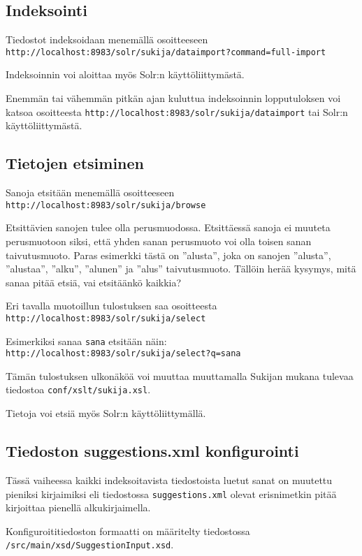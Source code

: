 \documentclass[12pt]{article}
\begin{document}
\subsection*{Indeksointi}

Tiedostot indeksoidaan menemällä osoitteeseen
\verb|http://localhost:8983/solr/sukija/dataimport?command=full-import|

Indeksoinnin voi aloittaa myös Solr:n käyttöliittymästä.

Enemmän tai vähemmän pitkän ajan kuluttua indeksoinnin lopputuloksen
voi katsoa osoitteesta
\verb|http://localhost:8983/solr/sukija/dataimport|
tai Solr:n käyttöliittymästä.


\subsection*{Tietojen etsiminen}

Sanoja etsitään menemällä osoitteeseen
\verb=http://localhost:8983/solr/sukija/browse=

Etsittävien sanojen tulee olla perusmuodossa. Etsittäessä sanoja ei
muuteta perusmuotoon siksi, että yhden sanan perusmuoto voi olla
toisen sanan taivutusmuoto. Paras esimerkki tästä on ''alusta'', joka
on sanojen ''alusta'', ''alustaa'', ''alku'', ''alunen'' ja ''alus''
taivutusmuoto. Tällöin herää kysymys, mitä sanaa pitää etsiä, vai
etsitäänkö kaikkia?


Eri tavalla muotoillun tulostuksen saa osoitteesta
\verb=http://localhost:8983/solr/sukija/select=

Esimerkiksi sanaa \verb=sana= etsitään näin:
\verb|http://localhost:8983/solr/sukija/select?q=sana|

Tämän tulostuksen ulkonäköä voi muuttaa muuttamalla Sukijan mukana
tulevaa tiedostoa \verb=conf/xslt/sukija.xsl=.

Tietoja voi etsiä myös Solr:n käyttöliittymällä.


\subsection*{Tiedoston suggestions.xml konfigurointi}

Tässä vaiheessa kaikki indeksoitavista tiedostoista luetut sanat on
muutettu pieniksi kirjaimiksi eli tiedostossa
\verb|suggestions.xml| olevat erisnimetkin pitää kirjoittaa
pienellä alkukirjaimella.

Konfiguroititiedoston formaatti on määritelty tiedostossa
\verb=/src/main/xsd/SuggestionInput.xsd=.
\end{document}
